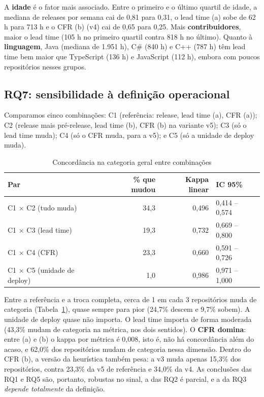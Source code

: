 \documentclass[12pt]{article}
\begin{document}
A \textbf{idade} é o fator mais associado. Entre o primeiro e o último
quartil de idade, a mediana de releases por semana cai de 0,81 para 0,31, o
lead time (a) sobe de 62 h para 713 h e o CFR (b) (v4) cai de 0,65 para 0,25.
Mais \textbf{contribuidores}, maior o lead time (105 h no primeiro quartil
contra 818 h no último). Quanto à \textbf{linguagem}, Java (mediana de 1.951 h),
C\# (840 h) e C++ (787 h) têm lead time bem maior que TypeScript (136 h) e
JavaScript (112 h), embora com poucos repositórios nesses grupos.

\subsection{RQ7: sensibilidade à definição operacional}

Comparamos cinco combinações: C1 (referência: release, lead time (a), CFR
(a)); C2 (release mais pré-release, lead time (b), CFR (b) na variante v5);
C3 (só o lead time muda); C4 (só o CFR muda, para a v5); e C5 (só a unidade de
deploy muda).

\begin{table}[ht]
\centering
\caption{Concordância na categoria geral entre combinações}
\label{tab:rq7}
\small
\begin{tabular}{lrrl}
\toprule
Par & \% que mudou & Kappa linear & IC 95\% \\
\midrule
C1 $\times$ C2 (tudo muda) & 34,3 & 0,496 & 0,414 -- 0,574 \\
C1 $\times$ C3 (lead time) & 19,3 & 0,732 & 0,669 -- 0,800 \\
C1 $\times$ C4 (CFR) & 23,3 & 0,660 & 0,591 -- 0,726 \\
C1 $\times$ C5 (unidade de deploy) & 1,0 & 0,986 & 0,971 -- 1,000 \\
\bottomrule
\end{tabular}
\end{table}

Entre a referência e a troca completa, cerca de 1 em cada 3 repositórios muda
de categoria (Tabela~\ref{tab:rq7}), quase sempre para pior (24,7\% descem e
9,7\% sobem). A unidade de deploy quase não importa. O lead time importa de
forma moderada (43,3\% mudam de categoria na métrica, nos dois sentidos). O
\textbf{CFR domina}: entre (a) e (b) o kappa por métrica é 0,008, isto é, não há
concordância além do acaso, e 62,0\% dos repositórios mudam de categoria nessa
dimensão. Dentro do CFR (b), a versão da heurística também pesa: a v3 muda
apenas 15,3\% dos repositórios, contra 23,3\% da v5 de referência e 34,0\% da
v4. As conclusões das RQ1 e RQ5 são, portanto, robustas no sinal, a das RQ2 é
parcial, e a da RQ3 \emph{depende totalmente} da definição.
\end{document}
